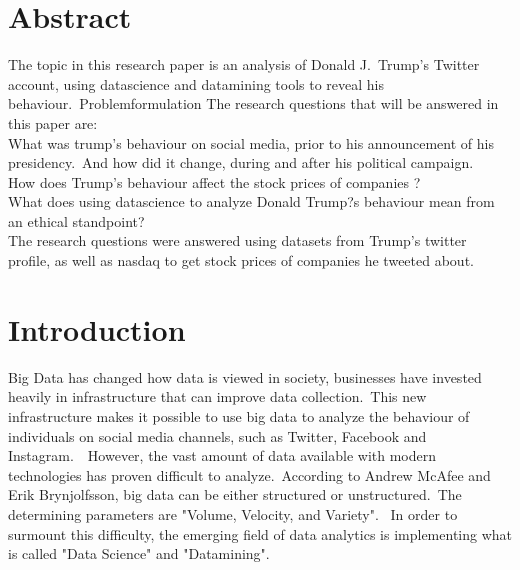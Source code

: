 \documentclass[11pt]{article}
\begin{document}
\color{NavyBlue} \tableofcontents \color{black}
\thispagestyle{empty} %
 \cleardoublepage
\setcounter{page}{1}%


\cleardoublepage%


\section{Abstract} %
The topic in this research paper is an analysis of Donald J.\ Trump's Twitter account, using datascience and datamining tools to reveal his behaviour.\
Problemformulation
The research questions that will be answered in this paper are:  \\

 What was trump's behaviour on social media, prior to his announcement of his presidency.\ And how did it change, during and after his political campaign.\ \\
 How does Trump's behaviour affect the stock prices of companies ?\\
 What does using datascience to analyze Donald Trump?s behaviour mean from an ethical standpoint?\\
 
 The research questions were answered using datasets from Trump's twitter profile, as well as nasdaq to get stock prices of companies he tweeted about.\
 

\cleardoublepage %



















\color{NavyBlue} \section{Introduction} \label{sec:intro}

\color {black}

Big Data has changed how data is viewed in society, businesses have invested heavily in infrastructure that can improve data collection.\ This new infrastructure makes it possible to use big data to analyze the behaviour of individuals on social media channels, such as Twitter, Facebook and Instagram.\ \citep{foster}\ However, the vast amount of data available with modern technologies has proven difficult to analyze.\ According to Andrew McAfee and Erik Brynjolfsson, big data can be either structured or unstructured.\ The determining parameters are "Volume, Velocity, and Variety". \citep{velocity}\ In order to surmount  this difficulty,  the emerging field of data analytics is implementing what is called "Data Science" and "Datamining".\ \\
\end{document}
